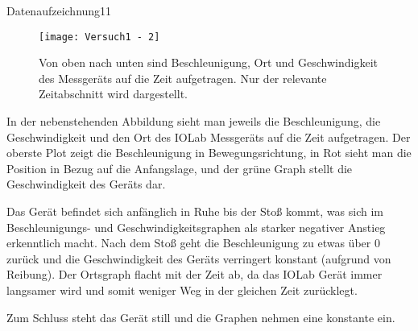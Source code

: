 \documentclass{alex_gp}
\begin{document}
\begin{myfigure}{Datenaufzeichnung}{11}
	\begin{wrapfigure}{r}{0.5\textwidth}
			\vspace{-1em}
			\texttt{[image: Versuch1 - 2]}
			\caption{Von oben nach unten sind Beschleunigung, Ort und Geschwindigkeit des Messgeräts auf die Zeit aufgetragen. Nur der relevante Zeitabschnitt wird dargestellt.}
	\end{wrapfigure}
	In der nebenstehenden Abbildung sieht man jeweils die Beschleunigung, die Geschwindigkeit und den Ort des IOLab Messgeräts auf die Zeit aufgetragen. 
	Der oberste Plot zeigt die Beschleunigung in Bewegungsrichtung, in Rot sieht man die Position in Bezug auf die Anfangslage, und der grüne Graph stellt die Geschwindigkeit des Geräts dar. \par
	
	\indent Das Gerät befindet sich anfänglich in Ruhe bis der Stoß kommt, was sich im Beschleunigungs- und Geschwindigkeitsgraphen als starker negativer Anstieg erkenntlich macht. 
	Nach dem Stoß geht die Beschleunigung zu etwas über 0 zurück und die Geschwindigkeit des Geräts verringert konstant (aufgrund von Reibung). Der Ortsgraph flacht mit der Zeit ab, da das IOLab Gerät immer langsamer wird und somit weniger Weg in der gleichen Zeit zurücklegt. \par
	
	Zum Schluss steht das Gerät still und die Graphen nehmen eine konstante ein.
\end{myfigure}
\newpage
\end{document}
